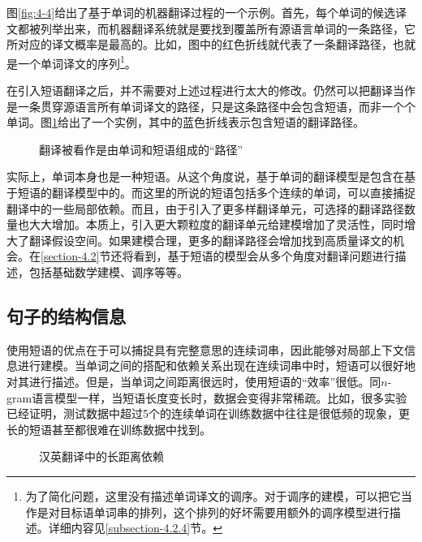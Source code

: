 \parinterval 图\ref{fig:4-4}给出了基于单词的机器翻译过程的一个示例。首先，每个单词的候选译文都被列举出来，而机器翻译系统就是要找到覆盖所有源语言单词的一条路径，它所对应的译文概率是最高的。比如，图中的红色折线就代表了一条翻译路径，也就是一个单词译文的序列\footnote[1]{为了简化问题，这里没有描述单词译文的调序。对于调序的建模，可以把它当作是对目标语单词串的排列，这个排列的好坏需要用额外的调序模型进行描述。详细内容见\ref{subsection-4.2.4}节。}。

\parinterval 在引入短语翻译之后，并不需要对上述过程进行太大的修改。仍然可以把翻译当作是一条贯穿源语言所有单词译文的路径，只是这条路径中会包含短语，而非一个个单词。图\ref{fig:4-5}给出了一个实例，其中的蓝色折线表示包含短语的翻译路径。

\begin{figure}[htp]
\centering

\caption{翻译被看作是由单词和短语组成的``路径''}
\label{fig:4-5}
\end{figure}

\parinterval 实际上，单词本身也是一种短语。从这个角度说，基于单词的翻译模型是包含在基于短语的翻译模型中的。而这里的所说的短语包括多个连续的单词，可以直接捕捉翻译中的一些局部依赖。而且，由于引入了更多样翻译单元，可选择的翻译路径数量也大大增加。本质上，引入更大颗粒度的翻译单元给建模增加了灵活性，同时增大了翻译假设空间。如果建模合理，更多的翻译路径会增加找到高质量译文的机会。在\ref{section-4.2}节还将看到，基于短语的模型会从多个角度对翻译问题进行描述，包括基础数学建模、调序等等。


\subsection{句子的结构信息}

\parinterval 使用短语的优点在于可以捕捉具有完整意思的连续词串，因此能够对局部上下文信息进行建模。当单词之间的搭配和依赖关系出现在连续词串中时，短语可以很好地对其进行描述。但是，当单词之间距离很远时，使用短语的``效率''很低。同$n$-gram语言模型一样，当短语长度变长时，数据会变得非常稀疏。比如，很多实验已经证明，测试数据中超过5个的连续单词在训练数据中往往是很低频的现象，更长的短语甚至都很难在训练数据中找到。

\begin{figure}[htp]
\centering

\caption{汉英翻译中的长距离依赖}
\label{fig:4-6}
\end{figure}

